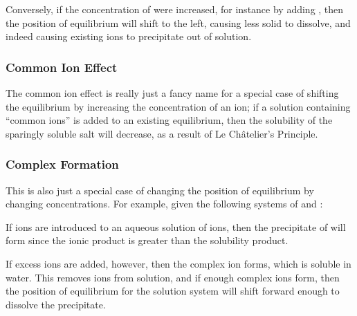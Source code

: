 			Conversely, if the concentration of  were increased, for instance by adding , then the position of equilibrium
			will shift to the left, causing less solid to dissolve, and indeed causing existing ions to precipitate out of solution.

			\subsubsection{Common Ion Effect}

				The common ion effect is really just a fancy name for a special case of shifting the equilibrium by increasing the concentration of an ion;
				if a solution containing \enquote{common ions} is added to an existing equilibrium, then the solubility of the sparingly soluble salt
				will decrease, as a result of Le Châtelier's Principle.


			\subsubsection{Complex Formation}

				This is also just a special case of changing the position of equilibrium by changing concentrations.
				For example, given the following systems of  and \ch{[\Al(OH)4]-}:


				If  ions are introduced to an aqueous solution of  ions, then the precipitate of  will form since
				the ionic product is greater than the solubility product.

				If excess  ions are added, however, then the complex ion \ch{[\Al(OH)4]-} forms, which is soluble in water. This
				removes  ions from solution, and if enough complex ions form, then the position of equilibrium for the solution system
				will shift forward enough to dissolve the precipitate.

















